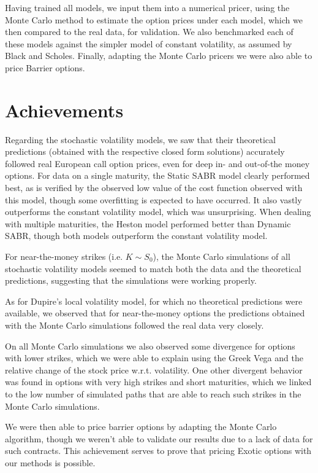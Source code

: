 Having trained all models, we input them into a numerical pricer, using the Monte Carlo method to estimate the option prices under each model, which we then compared to the real data, for validation. We also benchmarked each of these models against the simpler model of constant volatility, as assumed by Black and Scholes.
Finally, adapting the Monte Carlo pricers we were also able to price Barrier options.

\section{Achievements}
Regarding the stochastic volatility models, we saw that their theoretical predictions (obtained with the respective closed form solutions) accurately followed real European call option prices, even for deep in- and out-of-the money options.
For data on a single maturity, the Static SABR model clearly performed best, as is verified by the observed low value of the cost function observed with this model, though some overfitting is expected to have occurred. It also vastly outperforms the constant volatility model, which was unsurprising. When dealing with multiple maturities, the Heston model performed better than Dynamic SABR, though both models outperform the constant volatility model.

For near-the-money strikes (i.e. $K\sim S_0$), the Monte Carlo simulations of all stochastic volatility models seemed to match both the data and the theoretical predictions, suggesting that the simulations were working properly.

As for Dupire's local volatility model, for which no theoretical predictions were available, we observed that for near-the-money options the predictions obtained with the Monte Carlo simulations followed the real data very closely.

On all Monte Carlo simulations we also observed some divergence for options with lower strikes, which we were able to explain using the Greek Vega and the relative change of the stock price w.r.t. volatility. One other divergent behavior was found in options with very high strikes and short maturities, which we linked to the low number of simulated paths that are able to reach such strikes in the Monte Carlo simulations.

We were then able to price barrier options by adapting the Monte Carlo algorithm, though we weren't able to validate our results due to a lack of data for such contracts. This achievement serves to prove that pricing Exotic options with our methods is possible.

